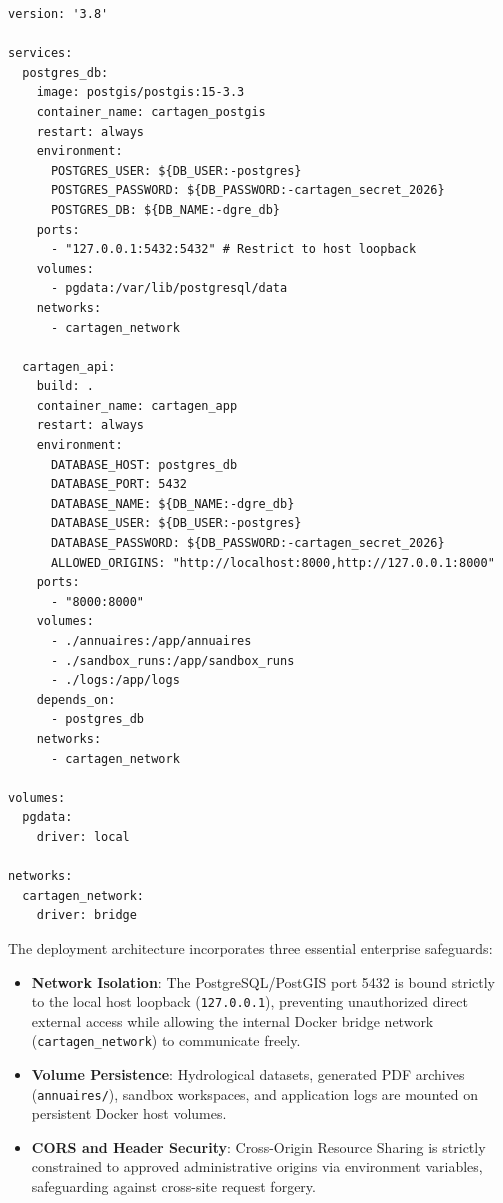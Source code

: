 \documentclass[12pt,a4paper]{report}
\begin{document}
\begin{lstlisting}[style=pythonstyle, caption={Production Docker Compose configuration (docker-compose.yml)}, label={lst:docker}]
version: '3.8'

services:
  postgres_db:
    image: postgis/postgis:15-3.3
    container_name: cartagen_postgis
    restart: always
    environment:
      POSTGRES_USER: ${DB_USER:-postgres}
      POSTGRES_PASSWORD: ${DB_PASSWORD:-cartagen_secret_2026}
      POSTGRES_DB: ${DB_NAME:-dgre_db}
    ports:
      - "127.0.0.1:5432:5432" # Restrict to host loopback
    volumes:
      - pgdata:/var/lib/postgresql/data
    networks:
      - cartagen_network

  cartagen_api:
    build: .
    container_name: cartagen_app
    restart: always
    environment:
      DATABASE_HOST: postgres_db
      DATABASE_PORT: 5432
      DATABASE_NAME: ${DB_NAME:-dgre_db}
      DATABASE_USER: ${DB_USER:-postgres}
      DATABASE_PASSWORD: ${DB_PASSWORD:-cartagen_secret_2026}
      ALLOWED_ORIGINS: "http://localhost:8000,http://127.0.0.1:8000"
    ports:
      - "8000:8000"
    volumes:
      - ./annuaires:/app/annuaires
      - ./sandbox_runs:/app/sandbox_runs
      - ./logs:/app/logs
    depends_on:
      - postgres_db
    networks:
      - cartagen_network

volumes:
  pgdata:
    driver: local

networks:
  cartagen_network:
    driver: bridge
\end{lstlisting}

The deployment architecture incorporates three essential enterprise safeguards:
\begin{itemize}
  \item \textbf{Network Isolation}: The PostgreSQL/PostGIS port 5432 is bound strictly to the local host loopback (\texttt{127.0.0.1}), preventing unauthorized direct external access while allowing the internal Docker bridge network (\texttt{cartagen\_network}) to communicate freely.
  \item \textbf{Volume Persistence}: Hydrological datasets, generated PDF archives (\texttt{annuaires/}), sandbox workspaces, and application logs are mounted on persistent Docker host volumes.
  \item \textbf{CORS and Header Security}: Cross-Origin Resource Sharing is strictly constrained to approved administrative origins via environment variables, safeguarding against cross-site request forgery.
\end{itemize}
\end{document}
